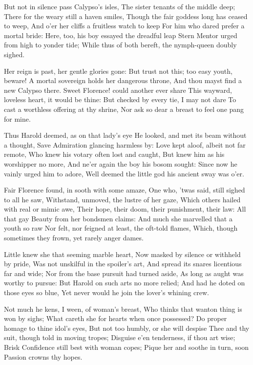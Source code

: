 \documentclass[10pt,twocolumn]{book}
\begin{document}
   But not in silence pass Calypso's isles,
   The sister tenants of the middle deep;
   There for the weary still a haven smiles,
   Though the fair goddess long has ceased to weep,
   And o'er her cliffs a fruitless watch to keep
   For him who dared prefer a mortal bride:
   Here, too, his boy essayed the dreadful leap
   Stern Mentor urged from high to yonder tide;
While thus of both bereft, the nymph-queen doubly sighed.


   Her reign is past, her gentle glories gone:
   But trust not this; too easy youth, beware!
   A mortal sovereign holds her dangerous throne,
   And thou mayst find a new Calypso there.
   Sweet Florence! could another ever share
   This wayward, loveless heart, it would be thine:
   But checked by every tie, I may not dare
   To cast a worthless offering at thy shrine,
Nor ask so dear a breast to feel one pang for mine.


   Thus Harold deemed, as on that lady's eye
   He looked, and met its beam without a thought,
   Save Admiration glancing harmless by:
   Love kept aloof, albeit not far remote,
   Who knew his votary often lost and caught,
   But knew him as his worshipper no more,
   And ne'er again the boy his bosom sought:
   Since now he vainly urged him to adore,
Well deemed the little god his ancient sway was o'er.


   Fair Florence found, in sooth with some amaze,
   One who, 'twas said, still sighed to all he saw,
   Withstand, unmoved, the lustre of her gaze,
   Which others hailed with real or mimic awe,
   Their hope, their doom, their punishment, their law:
   All that gay Beauty from her bondsmen claims:
   And much she marvelled that a youth so raw
   Nor felt, nor feigned at least, the oft-told flames,
Which, though sometimes they frown, yet rarely anger dames.


   Little knew she that seeming marble heart,
   Now masked by silence or withheld by pride,
   Was not unskilful in the spoiler's art,
   And spread its snares licentious far and wide;
   Nor from the base pursuit had turned aside,
   As long as aught was worthy to pursue:
   But Harold on such arts no more relied;
   And had he doted on those eyes so blue,
Yet never would he join the lover's whining crew.


   Not much he kens, I ween, of woman's breast,
   Who thinks that wanton thing is won by sighs;
   What careth she for hearts when once possessed?
   Do proper homage to thine idol's eyes,
   But not too humbly, or she will despise
   Thee and thy suit, though told in moving tropes;
   Disguise e'en tenderness, if thou art wise;
   Brisk Confidence still best with woman copes;
Pique her and soothe in turn, soon Passion crowns thy hopes.
\end{document}
